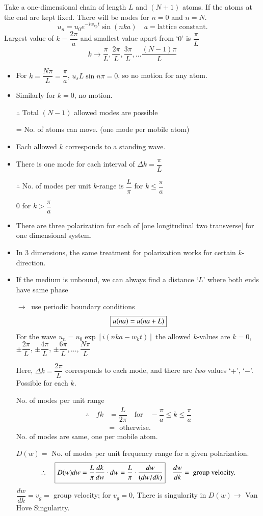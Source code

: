 Take a one-dimensional chain of length $L$ and $(N+1)$ atoms. If the atoms at the end are kept fixed. There will be nodes for $n=0$ and $n=N$.
$$
u_{n}=u_{0}e^{-iw_{kp}t}\sin (nka)\quad a= \text{lattice constant.}
$$
Largest value of $k=\dfrac{2\pi}{a}$ and smallest value apart from `$0$' is $\dfrac{\pi}{L}$
$$
k\to \dfrac{\pi}{L}, \dfrac{2\pi}{L}, \dfrac{3\pi}{L},\ldots \dfrac{(N-1)\pi}{L}
$$
\begin{itemize}
\item For $k=\dfrac{N\pi}{L}=\dfrac{\pi}{a}$, $u_{s}L\sin n\pi=0$, so no motion for any atom.

\item Similarly for $k=0$, no motion.

$\therefore$ Total $(N-1)$ allowed modes are possible

= No. of atoms can move. (one mode per mobile atom)

\item Each allowed $k$ corresponds to a standing wave.

\item There is one mode for each interval of $\Delta k=\dfrac{\pi}{L}$

$\therefore$ No. of modes per unit $k$-range is $\dfrac{L}{\pi}$ for $k\leq \dfrac{\pi}{a}$

$0$ for $k>\dfrac{\pi}{a}$

\item There are three polarization for each of [one longitudinal two transverse] for one dimensional system.

\item In 3 dimensions, the same treatment for polarization works for certain $k$-direction.

\item If the medium is unbound, we can always find a distance `$L$' where both ends have same phase 

$\to \ $ use periodic boundary conditions
$$
\fbox{$u(na)=u(na+L)$}
$$
For the wave $u_{n}=u_{0}\exp [i(nka-w_{k}t)]$ the allowed $k$-values are $k=0$, $\pm\dfrac{2\pi}{L}$, $\pm \dfrac{4\pi}{L}$, $\pm \dfrac{6\pi}{L},\ldots,\dfrac{N\pi}{L}$

Here, $\Delta k=\dfrac{2\pi}{L}$ corresponds to each mode, and there are {\em two} values `$+$', `$-$'. Possible for each $k$.

No. of modes per unit range
\begin{align*}
\therefore\quad fk &= \dfrac{L}{2\pi}\quad\text{for}\quad -\dfrac{\pi}{a}\leq k\leq \dfrac{\pi}{a}\\
&= \text{~ otherwise.}
\end{align*}
No. of modes are same, one per mobile atom.

$D(w)=$ No. of modes per unit frequency range for a given polarization.
$$
\therefore\quad \fbox{$D(w)dw=\dfrac{L}{\pi}\dfrac{dk}{dw}\cdot dw=\dfrac{L}{\pi}\cdot \dfrac{dw}{(dw/dk)}$}\quad \dfrac{dw}{dk}=\text{ group velocity.}
$$
$\dfrac{dw}{dk}=v_{g}=$ group velocity; for $v_{g}=0$, There is singularity in $D(w)\to$ Van Hove Singularity.
\end{itemize}


